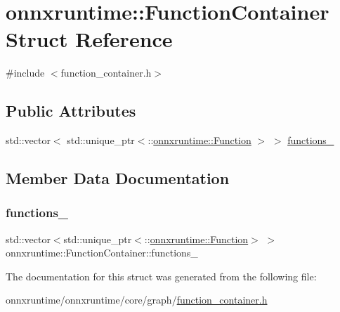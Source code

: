 \hypertarget{structonnxruntime_1_1FunctionContainer}{}\section{onnxruntime\+:\+:Function\+Container Struct Reference}
\label{structonnxruntime_1_1FunctionContainer}


{\ttfamily \#include $<$function\+\_\+container.\+h$>$}

\subsection*{Public Attributes}
\begin{DoxyCompactItemize}
\item 
std\+::vector$<$ std\+::unique\+\_\+ptr$<$\+::\mbox{\hyperlink{classonnxruntime_1_1Function}{onnxruntime\+::\+Function}} $>$ $>$ \mbox{\hyperlink{structonnxruntime_1_1FunctionContainer_a7fa290c0f31a7649836bdf56524c64dd}{functions\+\_\+}}
\end{DoxyCompactItemize}


\subsection{Member Data Documentation}
\mbox{\label{structonnxruntime_1_1FunctionContainer_a7fa290c0f31a7649836bdf56524c64dd}} 
\subsubsection{\texorpdfstring{functions\+\_\+}{functions\_}}
{\footnotesize\ttfamily std\+::vector$<$std\+::unique\+\_\+ptr$<$\+::\mbox{\hyperlink{classonnxruntime_1_1Function}{onnxruntime\+::\+Function}}$>$ $>$ onnxruntime\+::\+Function\+Container\+::functions\+\_\+}



The documentation for this struct was generated from the following file\+:\begin{DoxyCompactItemize}
\item 
onnxruntime/onnxruntime/core/graph/\mbox{\hyperlink{function__container_8h}{function\+\_\+container.\+h}}\end{DoxyCompactItemize}
